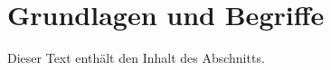 \section{Grundlagen und Begriffe}
\label{sec:02_fundamentals-and-terminology}

Dieser Text enthält den Inhalt des Abschnitts.
